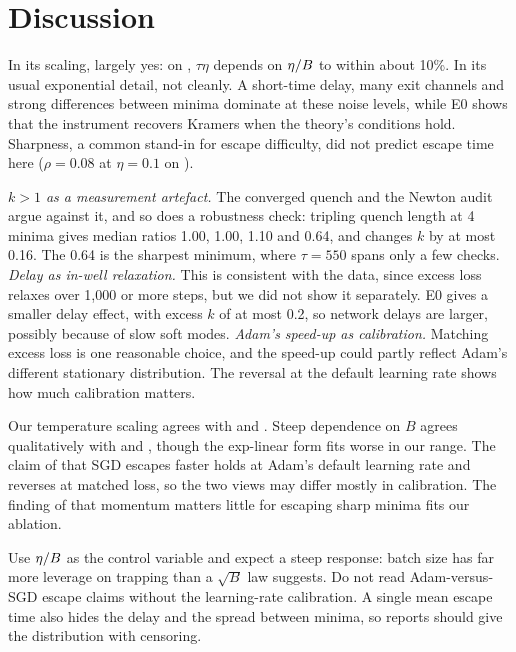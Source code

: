\section{Discussion}
\label{sec:discussion}

In its scaling, largely yes: on \fmnist, $\tau\eta$ depends on $\eta/B$ to within about 10\%.
In its usual exponential detail, not cleanly.
A short-time delay, many exit channels and strong differences between minima dominate at these noise levels, while E0 shows that the instrument recovers Kramers when the theory's conditions hold.
Sharpness, a common stand-in for escape difficulty, did not predict escape time here ($\rho=0.08$ at $\eta=0.1$ on \fmnist).

{\em $k>1$ as a measurement artefact.}
The converged quench and the Newton audit argue against it, and so does a robustness check: tripling quench length at 4 minima gives median ratios 1.00, 1.00, 1.10 and 0.64, and changes $k$ by at most 0.16.
The 0.64 is the sharpest minimum, where $\tau=550$ spans only a few checks.
{\em Delay as in-well relaxation.}
This is consistent with the data, since excess loss relaxes over 1,000 or more steps, but we did not show it separately.
E0 gives a smaller delay effect, with excess $k$ of at most 0.2, so network delays are larger, possibly because of slow soft modes.
{\em Adam's speed-up as calibration.}
Matching excess loss is one reasonable choice, and the speed-up could partly reflect Adam's different stationary distribution.
The reversal at the default learning rate shows how much calibration matters.

Our temperature scaling agrees with \citet{smith2018bayesian} and \citet{jastrzebski2018three}.
Steep dependence on $B$ agrees qualitatively with \citet{xie2021diffusion} and \citet{mori2022powerlaw}, though the exp-linear form fits worse in our range.
The claim of \citet{zhou2020towards} that SGD escapes faster holds at Adam's default learning rate and reverses at matched loss, so the two views may differ mostly in calibration.
The finding of \citet{xie2022adaptive} that momentum matters little for escaping sharp minima fits our \sgdm ablation.

Use $\eta/B$ as the control variable and expect a steep response: batch size has far more leverage on trapping than a $\sqrt{B}$ law suggests.
Do not read Adam-versus-SGD escape claims without the learning-rate calibration.
A single mean escape time also hides the delay and the spread between minima, so reports should give the distribution with censoring.


